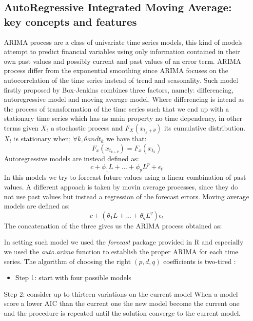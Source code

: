 \documentclass[twocolumn]{article}
\begin{document}
\subsection{AutoRegressive Integrated Moving Average: key concepts and features}
ARIMA process are a class of univariate time series models, this kind of models attempt to predict financial variables using only information contained in their own past values and possibly current and past values of an error term. ARIMA process differ from the exponential smoothing since ARIMA focuses on the autocorrelation of the time series instead of trend and seasonality. Such model firstly proposed by Box-Jenkins\cite{BoxGeorgeTimeSeriesAnalysis} combines three factors, namely: differencing, autoregressive model and moving average model.
\bigbreak
Where differencing is intend as the process of transformation of the time series such that we end up with a stationary time series which has as main property no time dependency, in other terms given $X_t$ a stochastic process and $F_X(x_{t_k+\theta})$ its cumulative distribution. $X_t$ is stationary when; $\forall k,\theta and t_k$ we have that:
\[ F_x(x_{t_{k+\theta}}) = F_x(x_{t_k}) \]
Autoregressive models are instead defined as:
\[ c+\phi_1L+...+\phi_pL^p+\epsilon_t \]
In this models we try to forecast future values using a linear combination of past values.
A different appoach is taken by movin average processes, since they do not use past values but instead a regression of the forecast errors.
Moving average models are defined as:
\[c + (\theta_1 L + ... + \theta_q L^q)\epsilon_t \]
The concatenation of the three gives us the ARIMA process obtained as:

In setting such model we used the \textit{forecast} package provided in R \cite{RobHyndmanForecastpackage}
and especially we used the \textit{auto.arima} function to establish 
the proper ARIMA for each time series. The algorithm of choosing the right $(p,d,q)$ coefficients is two-tired \cite{hyndman_automatic_2007}:
\begin{itemize}
    \item Step 1: start with four possible models
\end{itemize} Step 2: consider up to thirteen variations on the current model
When a model score a lower AIC than the current one the new model become the current one and the procedure is repeated until the solution converge to the current model.
\end{document}
